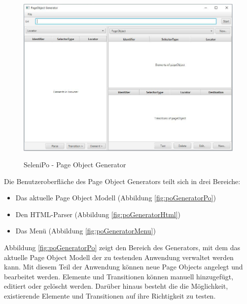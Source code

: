 \begin{figure}[htb]
  \centering  
  \includegraphics[scale=0.5]{img/poGenerator.JPG}\\
  \caption{SeleniPo - Page Object Generator}
  \label{fig:poGenerator}
\end{figure}



Die Benutzeroberfläche des Page Object Generators teilt sich in drei Bereiche:

\begin{itemize}
	\item Das aktuelle Page Object Modell (Abbildung \ref{fig:poGeneratorPo})
	\item Den HTML-Parser (Abbildung \ref{fig:poGeneratorHtml})
	\item Das Menü (Abbildung \ref{fig:poGeneratorMenu})
\end{itemize}


Abbildung \ref{fig:poGeneratorPo} zeigt den Bereich des Generators, mit dem das aktuelle Page Object Modell der zu testenden Anwendung verwaltet werden kann. Mit diesem Teil der Anwendung können neue Page Objects angelegt und bearbeitet werden. Elemente und Transitionen können manuell hinzugefügt, editiert oder gelöscht werden. Darüber hinaus besteht die die Möglichkeit, existierende Elemente und Transitionen auf ihre Richtigkeit zu testen.

